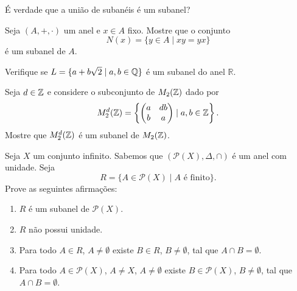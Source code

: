\documentclass[12pt]{exam}
\begin{document}
    \vspace{.3cm}

    \questao{} É verdade que a união de subanéis é um subanel?

    \vspace{.3cm}

    \questao{} Seja $(A, + , \cdot)$ um anel e $x \in A$ fixo. Mostre que o conjunto
    \[
        N(x) = \{y \in A \mid xy = yx\}
    \]
    é um subanel de $A$.

    \newpage

    \questao{} Verifique se $L = \{ a + b\sqrt{2} \mid a, b \in \mathbb{Q}\}$ é um subanel
    do anel $\mathbb{R}$.

    \vspace{.3cm}

    \questao{} Seja $d \in \mathbb{Z}$ e considere o subconjunto de $M_2(\mathbb{Z})$ dado por
    \[
        M_2^d(\mathbb{Z}) = \left\{\begin{pmatrix} a & db \\ b & a \end{pmatrix} \mid a, b \in \mathbb{Z}\right\}.
    \]
    Mostre que $M_2^d(\mathbb{Z})$ é um subanel de $M_2(\mathbb{Z})$.

    \vspace{.3cm}

    \questao{} Seja $X$ um conjunto infinito. Sabemos que $(\mathcal{P}(X), \Delta, \cap)$ é um anel com unidade. Seja
    \[
        R = \{A \in \mathcal{P}(X) \mid A \mbox{ é finito}\}.
    \]
    Prove as seguintes afirmações:
    \begin{enumerate}[label=({\alph*})]
        \item $R$ é um subanel de $\mathcal{P}(X)$.

        \item $R$ não possui unidade.

        \item Para todo $A \in R$, $A \ne \emptyset$ existe $B \in R$, $B \ne \emptyset$, tal que $A \cap B = \emptyset$.

        \item Para todo $A \in \mathcal{P}(X)$, $A \ne X$, $A \ne \emptyset$ existe $B \in \mathcal{P}(X)$, $B \ne \emptyset$, tal que $A \cap B = \emptyset$.
    \end{enumerate}

    \vspace{.6cm}
\end{document}
